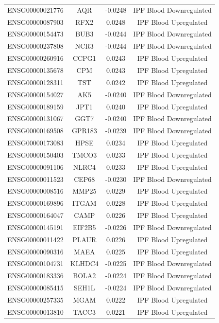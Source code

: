 \documentclass[
]{article}
\begin{document}
\begin{singlespace}
\begin{longtable}[t]{lccc}
ENSG00000021776 & AQR & -0.0248 & IPF Blood Downregulated\\
ENSG00000087903 & RFX2 & 0.0248 & IPF Blood Upregulated\\
ENSG00000154473 & BUB3 & -0.0244 & IPF Blood Downregulated\\
ENSG00000237808 & NCR3 & -0.0244 & IPF Blood Downregulated\\
ENSG00000260916 & CCPG1 & 0.0243 & IPF Blood Upregulated\\
\addlinespace
ENSG00000135678 & CPM & 0.0243 & IPF Blood Upregulated\\
ENSG00000128311 & TST & 0.0242 & IPF Blood Upregulated\\
ENSG00000154027 & AK5 & -0.0240 & IPF Blood Downregulated\\
ENSG00000189159 & JPT1 & 0.0240 & IPF Blood Upregulated\\
ENSG00000131067 & GGT7 & -0.0240 & IPF Blood Downregulated\\
\addlinespace
ENSG00000169508 & GPR183 & -0.0239 & IPF Blood Downregulated\\
ENSG00000173083 & HPSE & 0.0234 & IPF Blood Upregulated\\
ENSG00000150403 & TMCO3 & 0.0233 & IPF Blood Upregulated\\
ENSG00000091106 & NLRC4 & 0.0233 & IPF Blood Upregulated\\
ENSG00000011523 & CEP68 & -0.0230 & IPF Blood Downregulated\\
\addlinespace
ENSG00000008516 & MMP25 & 0.0229 & IPF Blood Upregulated\\
ENSG00000169896 & ITGAM & 0.0228 & IPF Blood Upregulated\\
ENSG00000164047 & CAMP & 0.0226 & IPF Blood Upregulated\\
ENSG00000145191 & EIF2B5 & -0.0226 & IPF Blood Downregulated\\
ENSG00000011422 & PLAUR & 0.0226 & IPF Blood Upregulated\\
\addlinespace
ENSG00000090316 & MAEA & 0.0225 & IPF Blood Upregulated\\
ENSG00000104731 & KLHDC4 & -0.0225 & IPF Blood Downregulated\\
ENSG00000183336 & BOLA2 & -0.0224 & IPF Blood Downregulated\\
ENSG00000085415 & SEH1L & -0.0224 & IPF Blood Downregulated\\
ENSG00000257335 & MGAM & 0.0222 & IPF Blood Upregulated\\
\addlinespace
ENSG00000013810 & TACC3 & 0.0221 & IPF Blood Upregulated\\

\end{longtable}
\end{singlespace}
\end{document}
